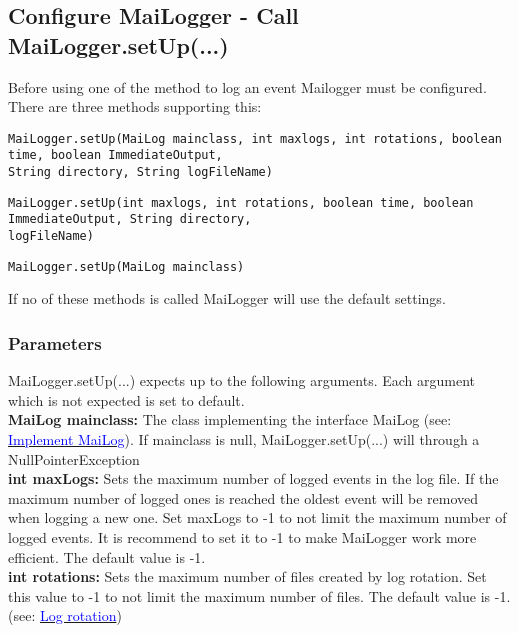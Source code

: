 \documentclass{article}
\newcommand{\refh}[2]{\hyperref[#1] {\textcolor{blue}{#2}}}
\begin{document}
    \subsection{Configure MaiLogger - Call MaiLogger.setUp(...)}
    \label{setup_mailogger.setup}
    Before using one of the method to log an event Mailogger must be configured.
    There are three methods supporting this:
    \begin{description}
        \item \lstinline|MaiLogger.setUp(MaiLog mainclass, int maxlogs, int rotations, boolean time, boolean ImmediateOutput, | \\
        	\lstinline|String directory, String logFileName)|
        \item \lstinline|MaiLogger.setUp(int maxlogs, int rotations, boolean time, boolean ImmediateOutput, String directory, | \\
        	\lstinline|logFileName)|
        \item \lstinline|MaiLogger.setUp(MaiLog mainclass)|
    \end{description}
	
	If no of these methods is called MaiLogger will use the default settings.

    \subsubsection{Parameters}
    \label{setup_mailogger.setup_1}
    MaiLogger.setUp(...) expects up to the following arguments. Each argument which is not expected is set to default. \\

    \textbf{MaiLog mainclass:}
    The class implementing the interface MaiLog (see: \refh{setup_interface}{Implement MaiLog}).
    If mainclass is null, MaiLogger.setUp(...) will through a NullPointerException \\

    \textbf{int maxLogs:}
    Sets the maximum number of logged events in the log file.
    If the maximum number of logged ones is reached the oldest event will be removed when logging a new one.
    Set maxLogs to -1 to not limit the maximum number of logged events.
    It is recommend to set it to -1 to make MaiLogger work more efficient.
    The default value is -1. \\

    \textbf{int rotations:}
    Sets the maximum number of files created by log rotation.
    Set this value to -1 to not limit the maximum number of files.
    The default value is -1. (see: \refh{rotate}{Log rotation}) \\
\end{document}
